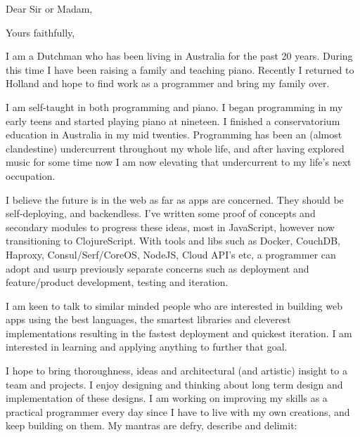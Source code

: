 \documentclass[11pt,a4paper,sans]{moderncv}        %
\begin{document}
\setcounter{page}{1}
 


\date{\today}
\opening{Dear Sir or Madam,}
\closing{Yours faithfully,}
\makelettertitle
\justify
I am a Dutchman who has been living in Australia for the past 20 years. During this time I have been raising a family and teaching piano. Recently I returned to Holland and hope to find work as a programmer and bring my family over. 
 
I am self-taught in both programming and piano. I began programming in my early teens and started playing piano at nineteen. I finished a conservatorium education in Australia in my mid twenties. Programming has been an (almost clandestine) undercurrent throughout my whole life, and after having explored music for some time now I am now elevating that undercurrent to my life's next occupation. 
 
I believe the future is in the web as far as apps are concerned. They should be self-deploying, and backendless. I've written some proof of concepts and secondary modules to progress these ideas, most in JavaScript, however now transitioning to ClojureScript. With tools and libs such as Docker, CouchDB, Haproxy, Consul/Serf/CoreOS, NodeJS, Cloud API's  etc, a programmer can adopt and usurp previously separate concerns such as deployment and feature/product development, testing and iteration. 
 
I am keen to talk to similar minded people who are interested in building web apps using the best languages, the smartest libraries and cleverest implementations resulting in the fastest deployment and quickest iteration. I am interested in learning and applying anything to further that goal. 
 
I hope to bring thoroughness, ideas and architectural (and artistic) insight to a team and projects. I enjoy designing and thinking about long term design and implementation of these designs. I am working on improving my skills as a practical programmer every day since I have to live with my own creations, and keep building on them. My mantras are defry, describe and delimit:
\vspace{3mm} %
\renewcommand{\labelitemi}{\textbullet}
 
\end{document}
